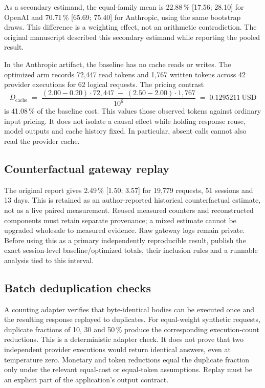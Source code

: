 \documentclass[11pt,a4paper]{article}
\begin{document}
As a secondary estimand, the equal-family mean is 22.88\,\% [17.56; 28.10] for OpenAI and
70.71\,\% [65.69; 75.40] for Anthropic, using the same bootstrap draws. This difference is a
weighting effect, not an arithmetic contradiction. The original manuscript described this
secondary estimand while reporting the pooled result.

In the Anthropic artifact, the baseline has no cache reads or writes. The optimized arm records
72{,}447 read tokens and 1{,}767 written tokens across 42 provider executions for 62 logical
requests. The pricing contrast
\begin{equation}
D_{\mathrm{cache}} \;=\; \frac{(2.00-0.20)\cdot 72{,}447 \;-\; (2.50-2.00)\cdot 1{,}767}{10^{6}}
\;=\; 0.1295211\ \text{USD}
\end{equation}
is 41.08\,\% of the baseline cost. This values those observed tokens against ordinary input
pricing. It does not isolate a causal effect while holding response reuse, model outputs and
cache history fixed. In particular, absent calls cannot also read the provider cache.

\subsection{Counterfactual gateway replay}
The original report gives 2.49\,\% [1.50; 3.57] for 19{,}779 requests, 51 sessions and 13 days.
This is retained as an author-reported historical counterfactual estimate, not as a live paired
measurement. Reused measured counters and reconstructed components must retain separate
provenance; a mixed estimate cannot be upgraded wholesale to measured evidence. Raw gateway
logs remain private. Before using this as a primary independently reproducible result, publish
the exact session-level baseline/optimized totals, their inclusion rules and a runnable analysis
tied to this interval.

\subsection{Batch deduplication checks}
A counting adapter verifies that byte-identical bodies can be executed once and the resulting
response replayed to duplicates. For equal-weight synthetic requests, duplicate fractions of
10, 30 and 50\,\% produce the corresponding execution-count reductions. This is a deterministic
adapter check. It does not prove that two independent provider executions would return identical
answers, even at temperature zero. Monetary and token reductions equal the duplicate fraction
only under the relevant equal-cost or equal-token assumptions. Replay must be an explicit part
of the application's output contract.
\end{document}
